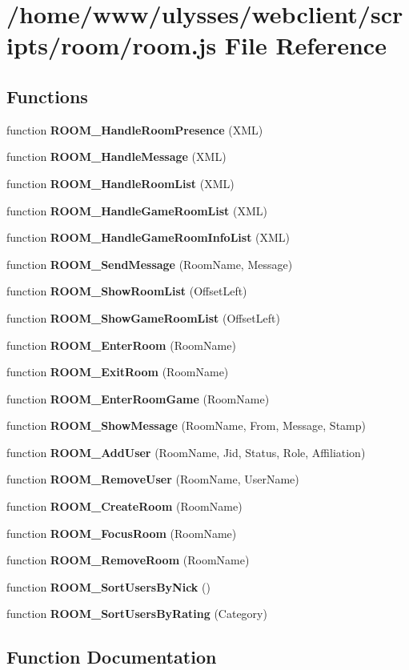 \section{/home/www/ulysses/webclient/scripts/room/room.js File Reference}
\label{room_2room_8js}
\subsection*{Functions}
\begin{CompactItemize}
\item 
function {\bf ROOM\_\-HandleRoomPresence} (XML)
\item 
function {\bf ROOM\_\-HandleMessage} (XML)
\item 
function {\bf ROOM\_\-HandleRoomList} (XML)
\item 
function {\bf ROOM\_\-HandleGameRoomList} (XML)
\item 
function {\bf ROOM\_\-HandleGameRoomInfoList} (XML)
\item 
function {\bf ROOM\_\-SendMessage} (RoomName, Message)
\item 
function {\bf ROOM\_\-ShowRoomList} (OffsetLeft)
\item 
function {\bf ROOM\_\-ShowGameRoomList} (OffsetLeft)
\item 
function {\bf ROOM\_\-EnterRoom} (RoomName)
\item 
function {\bf ROOM\_\-ExitRoom} (RoomName)
\item 
function {\bf ROOM\_\-EnterRoomGame} (RoomName)
\item 
function {\bf ROOM\_\-ShowMessage} (RoomName, From, Message, Stamp)
\item 
function {\bf ROOM\_\-AddUser} (RoomName, Jid, Status, Role, Affiliation)
\item 
function {\bf ROOM\_\-RemoveUser} (RoomName, UserName)
\item 
function {\bf ROOM\_\-CreateRoom} (RoomName)
\item 
function {\bf ROOM\_\-FocusRoom} (RoomName)
\item 
function {\bf ROOM\_\-RemoveRoom} (RoomName)
\item 
function {\bf ROOM\_\-SortUsersByNick} ()
\item 
function {\bf ROOM\_\-SortUsersByRating} (Category)
\end{CompactItemize}


\subsection{Function Documentation}
